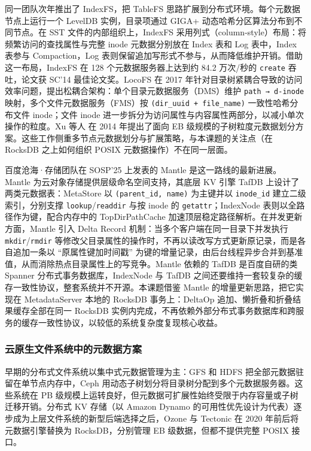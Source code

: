 同一团队次年推出了 IndexFS\cite{ren2014indexfs}，把 TableFS 思路扩展到分布式环境。每个元数据节点上运行一个 LevelDB 实例，目录项通过 GIGA+ 动态哈希分区算法分布到不同节点。在 SST 文件的内部组织上，IndexFS 采用列式（column-style）布局：将频繁访问的查找属性与完整 inode 元数据分别放在 Index 表和 Log 表中，Index 表参与 Compaction，Log 表则保留追加写形式不参与，从而降低维护开销。借助这一布局，IndexFS 在 128 个元数据服务器上达到约 84.2 万次/秒的 \texttt{create} 吞吐，论文获 SC'14 最佳论文奖。LocoFS\cite{li2017locofs} 在 2017 年针对目录树紧耦合导致的访问效率问题，提出松耦合架构：单个目录元数据服务（DMS）维护 \texttt{path → d-inode} 映射，多个文件元数据服务（FMS）按 \texttt{(dir\_uuid + file\_name)} 一致性哈希分布文件 inode；文件 inode 进一步拆分为访问属性与内容属性两部分，以减小单次操作的粒度。Xu 等人\cite{xu2014drop} 在 2014 年提出了面向 EB 级规模的子树粒度元数据划分方案。这些工作侧重多节点元数据划分与扩展策略，与本课题的关注点（在 RocksDB 之上如何组织 POSIX 元数据操作）不在同一层面。

百度沧海·存储团队在 SOSP'25 上发表的 Mantle\cite{li2025mantle} 是这一路线的最新进展。Mantle 为云对象存储提供层级命名空间支持，其底层 KV 引擎 TafDB 上设计了两类元数据表：MetaStore 以 \texttt{(parent\_id, name)} 为主键并以 \texttt{inode\_id} 建立二级索引，分别支撑 \texttt{lookup}/\texttt{readdir} 与按 inode 的 \texttt{getattr}；IndexNode 表则以全路径作为键，配合内存中的 TopDirPathCache 加速顶层稳定路径解析。在并发更新方面，Mantle 引入 Delta Record 机制：当多个客户端在同一目录下并发执行 \texttt{mkdir}/\texttt{rmdir} 等修改父目录属性的操作时，不再以读改写方式更新原记录，而是各自追加一条以 “原属性键加时间戳” 为键的增量记录，由后台线程异步合并到基准值，从而消除热点目录属性上的写竞争。Mantle 依赖的 TafDB 是百度自研的类 Spanner 分布式事务数据库，IndexNode 与 TafDB 之间还要维持一套较复杂的缓存一致性协议，整套系统并不开源。本课题借鉴 Mantle 的增量更新思路，把它实现在 MetadataServer 本地的 RocksDB 事务上：DeltaOp 追加、懒折叠和折叠结果缓存全部在同一 RocksDB 实例内完成，不再依赖外部分布式事务数据库和跨服务的缓存一致性协议，以较低的系统复杂度复现核心收益。

\subsubsection{云原生文件系统中的元数据方案}

早期的分布式文件系统以集中式元数据管理为主：GFS\cite{ghemawat2003gfs} 和 HDFS\cite{shvachko2010hdfs} 把全部元数据驻留在单节点内存中，Ceph\cite{weil2006ceph} 用动态子树划分将目录树分配到多个元数据服务器。这些系统在 PB 级规模上运转良好，但元数据可扩展性始终受限于内存容量或子树迁移开销。分布式 KV 存储（以 Amazon Dynamo\cite{decandia2007dynamo} 的可用性优先设计为代表）逐步成为上层文件系统的新型后端选择之后，Ozone 与 Tectonic 在 2020 年前后将元数据引擎替换为 RocksDB，分别管理 EB 级数据，但都不提供完整 POSIX 接口。

